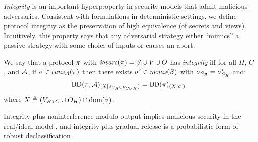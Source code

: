 \emph{Integrity} is an important hyperproperty in security models that
admit malicious adversaries. Consistent with formulations in
deterministic settings, we define protocol integrity as the
preservation of high equivalence (of secrets and views). Intuitively,
this property says that any adversarial strategy either ``mimics'' a
passive strategy with some choice of inputs or causes an abort.
\begin{definition}[Integrity]
  \label{def-integrity}
  We say that a protocol $\pi$ with $\mathit{iovars}(\pi) = S \cup V \cup O$ has
  \emph{integrity} iff for all $H$, $C$, and $\mathcal{A}$,
  if $\sigma \in \mathit{runs}_{\mathcal{A}}(\pi)$ 
  then there exists $\sigma' \in \mathit{mems}(S)$ with $\sigma_{S_H} = \sigma'_{S_H} $ and:
    $$
    \mathrm{BD}(\pi,\mathcal{A})_{({X}|{\sigma_{S_H \cup V_{C \rhd H}}})} =
    \mathrm{BD}(\pi)_{({X}|{\sigma'})}
    $$ 
  where $X \triangleq (V_{H \rhd C} \cup O_H) \cap \mathrm{dom}(\sigma)$. 
\end{definition}
Integrity plus noninterference modulo output implies malicious security
in the real/ideal model \cite{skalka-near-ppdp24}, and integrity plus
gradual release is a probabilistic form of robust declassification
\cite{sabelfeld2009declassification}.


